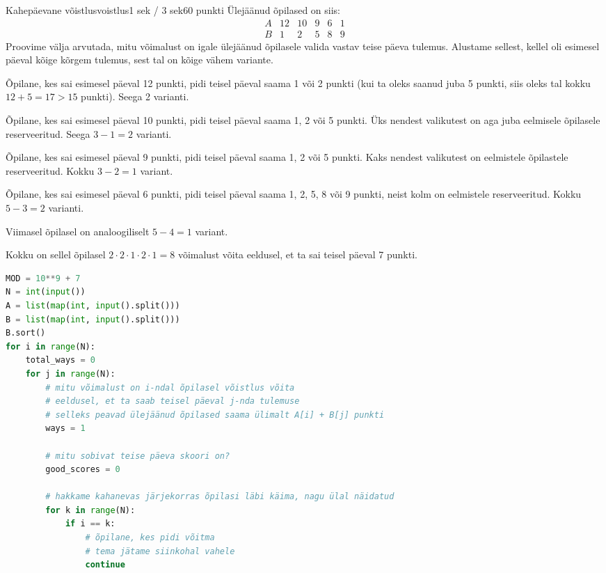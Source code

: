 \begin{yl}{4}{Kahepäevane võistlus}{voistlus}{1 sek / 3 sek}{60 punkti}
  Ülejäänud õpilased on siis:
  \[
  \begin{array}{r|cccccc}
    A & 12 & 10 & 9 & 6 & 1 \\
    \hline
    B &  1 &  2 & 5 & 8 & 9
  \end{array}
  \]
  Proovime välja arvutada, mitu võimalust on igale ülejäänud õpilasele valida
  vastav teise päeva tulemus. Alustame sellest, kellel oli esimesel päeval
  kõige kõrgem tulemus, sest tal on kõige vähem variante.
  \begin{xitem}
  \item Õpilane, kes sai esimesel päeval 12 punkti, pidi teisel päeval saama
    1 või 2 punkti (kui ta oleks saanud juba 5 punkti, siis oleks tal kokku
    $12 + 5 = 17 > 15$ punkti). Seega 2 varianti.
  \item Õpilane, kes sai esimesel päeval 10 punkti, pidi teisel päeval saama
    1, 2 või 5 punkti. Üks nendest valikutest on aga juba eelmisele õpilasele
    reserveeritud. Seega $3 - 1 = 2$ varianti.
  \item Õpilane, kes sai esimesel päeval 9 punkti, pidi teisel päeval saama
    1, 2 või 5 punkti. Kaks nendest valikutest on eelmistele õpilastele reserveeritud.
    Kokku $3 - 2 = 1$ variant.
  \item Õpilane, kes sai esimesel päeval 6 punkti, pidi teisel päeval saama
    1, 2, 5, 8 või 9 punkti, neist kolm on eelmistele reserveeritud.
    Kokku $5 - 3 = 2$ varianti.
  \item Viimasel õpilasel on analoogiliselt $5 - 4 = 1$ variant.
  \end{xitem}
  Kokku on sellel õpilasel $2 \cdot 2 \cdot 1 \cdot 2 \cdot 1 = 8$ võimalust
  võita eeldusel, et ta sai teisel päeval 7 punkti.
  \begin{lstlisting}[language=Python]
MOD = 10**9 + 7
N = int(input())
A = list(map(int, input().split()))
B = list(map(int, input().split()))
B.sort()
for i in range(N):
    total_ways = 0
    for j in range(N):
        # mitu võimalust on i-ndal õpilasel võistlus võita
        # eeldusel, et ta saab teisel päeval j-nda tulemuse
        # selleks peavad ülejäänud õpilased saama ülimalt A[i] + B[j] punkti
        ways = 1

        # mitu sobivat teise päeva skoori on?
        good_scores = 0

        # hakkame kahanevas järjekorras õpilasi läbi käima, nagu ülal näidatud
        for k in range(N):
            if i == k:
                # õpilane, kes pidi võitma
                # tema jätame siinkohal vahele
                continue


\end{lstlisting}
\end{yl}
